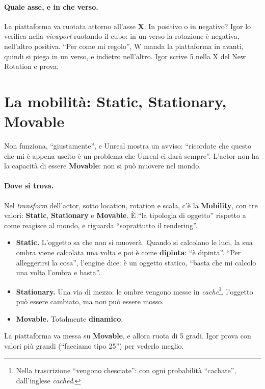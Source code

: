 \paragraph{Quale asse, e in che verso.} La piattaforma va ruotata attorno all'asse
\textbf{X}. In positivo o in negativo? Igor lo verifica nella \emph{viewport} ruotando il
cubo: in un verso la rotazione è negativa, nell'altro positiva. ``Per come mi regolo'',
W manda la piattaforma in avanti, quindi si piega in un verso, e indietro nell'altro.
Igor scrive 5 nella X del New Rotation e prova.

\section{La mobilità: Static, Stationary, Movable}
\label{ue2:sec:mobilita}

Non funziona, ``giustamente'', e Unreal mostra un avviso: ``ricordate che questo che mi è
appena uscito è un problema che Unreal ci darà sempre''. L'actor non ha la capacità di
essere \textbf{Movable}: non si può muovere nel mondo.

\paragraph{Dove si trova.} Nel \emph{transform} dell'actor, sotto location, rotation e
scala, c'è la \textbf{Mobility}, con tre valori: \textbf{Static}, \textbf{Stationary} e
\textbf{Movable}. È ``la tipologia di oggetto'' rispetto a come reagisce al mondo, e
riguarda ``soprattutto il rendering''.
\begin{itemize}
  \item \textbf{Static.} L'oggetto sa che non si muoverà. Quando si calcolano le luci,
        la sua ombra viene calcolata una volta e poi è come \textbf{dipinta}: ``è
        dipinta''. ``Per alleggerirsi la cosa'', l'engine dice: è un oggetto statico,
        ``basta che mi calcolo una volta l'ombra e basta''.
  \item \textbf{Stationary.} Una via di mezzo: le ombre vengono messe in
        \emph{cache}\footnote{Nella trascrizione ``vengono chesciate'': con ogni
        probabilità ``cachate'', dall'inglese \emph{cached}.}, l'oggetto può essere
        cambiato, ma non può essere mosso.
  \item \textbf{Movable.} Totalmente \textbf{dinamico}.
\end{itemize}
La piattaforma va messa su \textbf{Movable}, e allora ruota di 5 gradi. Igor prova con
valori più grandi (``facciamo tipo 25'') per vederlo meglio.

